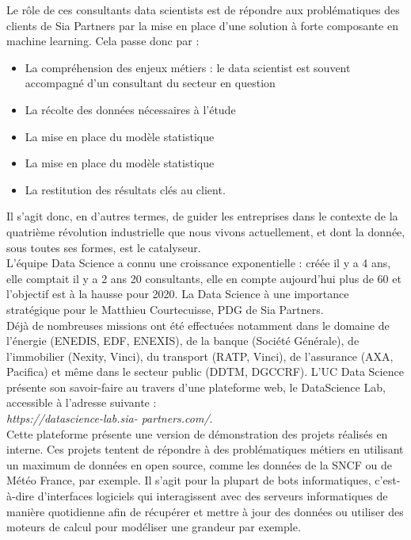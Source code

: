 \documentclass{article} %
\begin{document}
Le rôle de ces consultants data scientists est de répondre aux problématiques des clients de Sia Partners par la mise en place d’une solution à forte composante en machine learning. Cela passe donc par :
\begin{itemize}
	\item La compréhension des enjeux métiers : le data scientist est souvent accompagné d’un consultant du secteur en question
	\item  La récolte des données nécessaires à l’étude
	\item La mise en place du modèle statistique
	\item La mise en place du modèle statistique 
	\item La restitution des résultats clés au client.
\end{itemize}

Il s’agit donc, en d’autres termes, de guider les entreprises dans le contexte de la quatrième révolution industrielle que nous vivons actuellement, et dont la donnée, sous toutes ses formes, est le catalyseur.\\

L’équipe Data Science a connu une croissance exponentielle : créée il y a 4 ans, elle comptait il y a 2 ans 20 consultants, elle en compte aujourd’hui plus de 60 et l’objectif est à la hausse pour 2020. La Data Science à une importance stratégique pour le Matthieu Courtecuisse, PDG de Sia Partners.\\

Déjà de nombreuses missions ont été effectuées notamment dans le domaine de l’énergie (ENEDIS, EDF, ENEXIS), de la banque (Société Générale), de l’immobilier (Nexity, Vinci), du transport (RATP, Vinci), de l’assurance (AXA, Pacifica) et même dans le secteur public (DDTM, DGCCRF). 
L’UC Data Science présente son savoir-faire au travers d’une plateforme web, le DataScience Lab, accessible à l’adresse suivante :\\ \textit{https://datascience-lab.sia- partners.com/}. \\

Cette plateforme présente une version de démonstration des projets réalisés en interne. Ces projets tentent de répondre à des problématiques métiers en utilisant un maximum de données en open source, comme les données de la SNCF ou de Météo France, par exemple. Il s’agit pour la plupart de bots informatiques, c’est-à-dire d’interfaces logiciels qui interagissent avec des serveurs informatiques de manière quotidienne afin de récupérer et mettre à jour des données ou utiliser des moteurs de calcul pour modéliser une grandeur par exemple. \\
\end{document}
